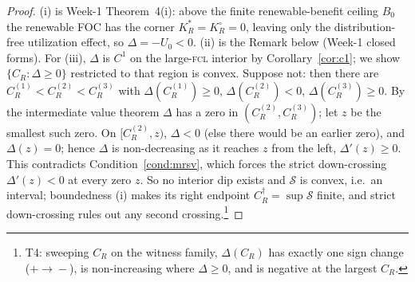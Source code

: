 \documentclass[11pt,reqno]{amsart}
\theoremstyle{plain}
\theoremstyle{definition}
\theoremstyle{remark}
\newcommand{\KRs}{K_R^{*}}
\newcommand{\KRo}{K_R^{\circ}}
\newcommand{\CR}{C_R}
\begin{document}
\begin{proof}
(i) is Week-1 Theorem~4(i): above the finite renewable-benefit ceiling $B_0$ the
renewable FOC has the corner $\KRs=\KRo=0$, leaving only the distribution-free
utilization effect, so $\Delta=-U_0<0$. (ii) is the Remark below (Week-1 closed
forms). For (iii), $\Delta$ is $C^{1}$ on the large-\textsc{fcl} interior by
Corollary~\ref{cor:c1}; we show $\{\CR:\Delta\ge0\}$ restricted to that region is
convex. Suppose not: then there are
$\CR^{(1)}<\CR^{(2)}<\CR^{(3)}$ with $\Delta(\CR^{(1)})\ge0$, $\Delta(\CR^{(2)})<0$,
$\Delta(\CR^{(3)})\ge0$. By the intermediate value theorem $\Delta$ has a zero in
$(\CR^{(2)},\CR^{(3)})$; let $z$ be the smallest such zero. On $[\CR^{(2)},z)$, $\Delta<0$
(else there would be an earlier zero), and $\Delta(z)=0$; hence $\Delta$ is
non-decreasing as it reaches $z$ from the left, $\Delta'(z)\ge0$. This contradicts
Condition~\ref{cond:mrsv}, which forces the strict down-crossing $\Delta'(z)<0$ at
every zero $z$. So no interior dip exists and $\mathcal S$ is convex, i.e.\ an
interval; boundedness (i) makes its right endpoint $\CR^{\dagger}=\sup\mathcal S$
finite, and strict down-crossing rules out any second crossing.\footnote{T4:
sweeping $\CR$ on the witness family, $\Delta(\CR)$ has exactly one sign change
($+\!\to\!-$), is non-increasing where $\Delta\ge0$, and is negative at the
largest $\CR$.}
\end{proof}
\end{document}
